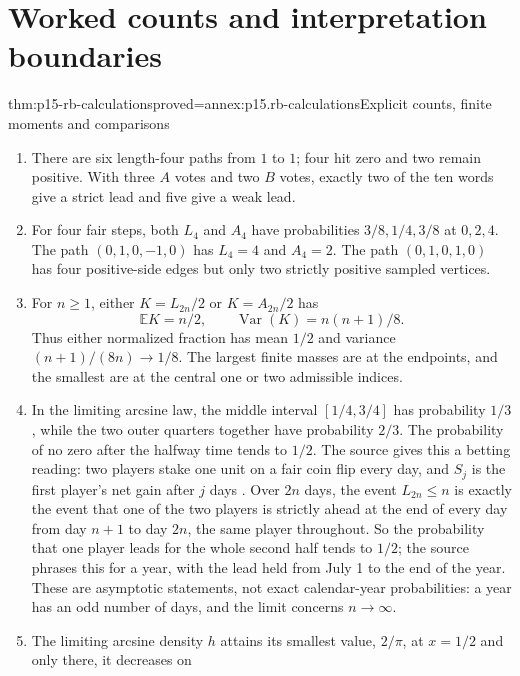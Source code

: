 \section{Worked counts and interpretation boundaries}
\label{sec:p15-rb-calculations}

\begin{hbtheorem}{thm:p15-rb-calculations}{proved=annex:p15.rb-calculations}{Explicit counts, finite moments and comparisons}
\begin{enumerate}
\item There are six length-four paths from \(1\) to \(1\);
 four hit zero and two remain positive.
 With three \(A\) votes and two \(B\) votes, exactly two of
 the ten words give a strict lead and five give a weak lead.
\item For four fair steps, both \(L_4\) and \(A_4\) have
 probabilities \(3/8,1/4,3/8\) at \(0,2,4\).
 The path \((0,1,0,-1,0)\) has \(L_4=4\) and \(A_4=2\).
 The path \((0,1,0,1,0)\) has four positive-side edges but
 only two strictly positive sampled vertices.
\item For \(n\geq1\), either \(K=L_{2n}/2\) or \(K=A_{2n}/2\)
 has
 \[
  \mathbb EK=n/2,\qquad \operatorname{Var}(K)=n(n+1)/8.
 \]
 Thus either normalized fraction has mean \(1/2\) and
 variance \((n+1)/(8n)\to1/8\).
 The largest finite masses are at the endpoints, and the
 smallest are at the central one or two admissible indices.
\item In the limiting arcsine law, the middle interval
 \([1/4,3/4]\) has probability \(1/3\), while the two outer
 quarters together have probability \(2/3\).
 The probability of no zero after the halfway time tends to
 \(1/2\). The source gives this a betting reading: two players
 stake one unit on a fair coin flip every day, and \(S_j\) is the
 first player's net gain after \(j\) days
 \cite[p.~265]{DurrettPTEAuthor2019}. Over \(2n\) days, the event
 \(L_{2n}\leq n\) is exactly the event that one of the two players
 is strictly ahead at the end of every day from day \(n+1\) to day
 \(2n\), the same player throughout. So the probability that one
 player leads for the whole second half tends to \(1/2\); the source
 phrases this for a year, with the lead held from July 1 to the end of
 the year. These are asymptotic statements, not exact calendar-year
 probabilities: a year has an odd number of days, and the limit
 concerns \(n\to\infty\).
\item The limiting arcsine density \(h\) attains its smallest value,
 \(2/\pi\), at \(x=1/2\) and only there, it decreases on

\end{enumerate}
\end{hbtheorem}
